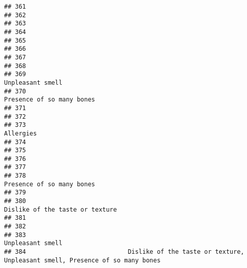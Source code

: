 \documentclass[
]{article}
\begin{document}
\begin{verbatim}
## 361                                                                                                        
## 362                                                                                                        
## 363                                                                                                        
## 364                                                                                                        
## 365                                                                                                        
## 366                                                                                                        
## 367                                                                                                        
## 368                                                                                                        
## 369                                                                                        Unpleasant smell
## 370                                                                               Presence of so many bones
## 371                                                                                                        
## 372                                                                                                        
## 373                                                                                               Allergies
## 374                                                                                                        
## 375                                                                                                        
## 376                                                                                                        
## 377                                                                                                        
## 378                                                                               Presence of so many bones
## 379                                                                                                        
## 380                                                                         Dislike of the taste or texture
## 381                                                                                                        
## 382                                                                                                        
## 383                                                                                        Unpleasant smell
## 384                            Dislike of the taste or texture, Unpleasant smell, Presence of so many bones

\end{verbatim}
\end{document}
